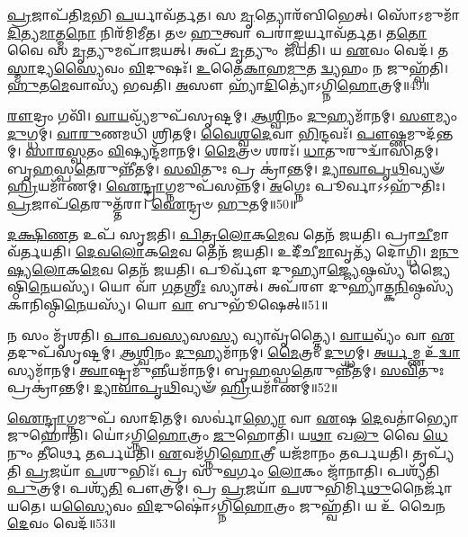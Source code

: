 \-\ul{𑌪𑍍𑌰}\-𑌜𑌾𑌪᳴𑌤𑌿\-\ul{𑌮}\-𑌭𑌿 \ul{𑌪}\-𑌰𑍍𑌯𑌾𑌵᳴𑌰𑍍𑌤𑌤।
𑌸 \ul{𑌮𑍃}\-𑌤𑍍𑌯𑍋𑌰᳴𑌬𑌿𑌭𑍇𑌤𑍍।
𑌸𑍋᳴𑌽𑌮𑍁𑌮𑌾᳴\-\ul{𑌦𑌿}\-𑌤𑍍𑌯\-\-\ul{𑌮𑌾}\-𑌤𑍍𑌮\-\ul{𑌨𑍋} 𑌨𑌿𑌰᳴𑌮𑌿𑌮𑍀𑌤।
𑌤𑍞 \ul{𑌹𑍁}\-𑌤𑍍𑌵𑌾 𑌪𑌰𑌾॑\-\ul{𑌙𑍍𑌪}\-𑌰𑍍𑌯𑌾𑌵᳴𑌰𑍍𑌤𑌤।
𑌤\-\ul{𑌤𑍋} 𑌵𑍈 𑌸 \ul{𑌮𑍃}\-𑌤𑍍𑌯𑍁𑌮𑌪𑌾᳴𑌜𑌯𑌤𑍍।
𑌅𑌪᳴ \ul{𑌮𑍃}\-𑌤𑍍𑌯𑍁𑌂 𑌜᳴𑌯𑌤𑌿।
𑌯 \ul{𑌏}\-𑌵𑌂 𑌵𑍇𑌦᳴।
𑌤\-\ul{𑌸𑍍𑌮𑌾}\-𑌦𑍍𑌯\-\ul{𑌸𑍍𑌯𑍈}\-𑌵𑌂 \ul{𑌵𑌿}\-𑌦𑍁𑌷𑌃᳴।
\-\ul{𑌉}\-𑌤𑍈\-\ul{𑌕𑌾}\-𑌹\-\ul{𑌮𑍁}\-𑌤 \ul{𑌦𑍍𑌵𑍍𑌯}\-𑌹𑌂 𑌨 𑌜𑍁𑌹𑍍𑌵᳴𑌤𑌿।
\-\ul{𑌹𑍁}\-𑌤\-\ul{𑌮𑍇}\-𑌵𑌾𑌸𑍍𑌯᳴ 𑌭𑌵𑌤𑌿।
\-\ul{𑌅}\-𑌸𑍗 𑌹𑍍𑌯𑌾᳴\-\ul{𑌦𑌿}\-𑌤𑍍𑌯𑍋॑\-𑌽𑌗𑍍𑌨𑌿\-\ul{𑌹𑍋}\-𑌤𑍍𑌰𑌮𑍍॥49॥\anuvakamend[\-\ul{𑌤}\-𑌨𑍁𑌵𑍈᳴ \ul{𑌵𑌾}\-𑌯𑍁\-\ul{𑌰}\-𑌗𑍍𑌨𑌿𑌰𑍍𑌭᳴\-\ul{𑌵}\-𑌤𑍍𑌯𑌵𑌿᳴𑌤𑍍𑌵𑌾 𑌭\-\ul{𑌵}\-𑌤𑍍𑌯𑍇𑌕𑌂᳴ 𑌚]

\-\ul{𑌰𑍗}\-𑌦𑍍𑌰𑌂 𑌗𑌵𑌿᳴।
\-\ul{𑌵𑌾}\-\-\ul{𑌯}\-𑌵𑍍𑌯᳴𑌮𑍁𑌪᳴𑌸𑍃𑌷𑍍𑌟𑌮𑍍।
\-\ul{𑌆}\-\-\ul{𑌶𑍍𑌵𑌿}\-𑌨𑌂 \ul{𑌦𑍁}\-𑌹𑍍𑌯𑌮𑌾᳴𑌨𑌮𑍍।
\-\ul{𑌸𑍗}\-𑌮𑍍𑌯𑌂 \ul{𑌦𑍁}\-𑌗𑍍𑌧𑌮𑍍।
\-\ul{𑌵𑌾}\-\-\ul{𑌰𑍁}\-𑌣𑌮𑌧𑌿᳴ 𑌶𑍍𑌰𑌿𑌤𑌮𑍍।
\-\ul{𑌵𑍈}\-\-\ul{𑌶𑍍𑌵}\-\-\ul{𑌦𑍇}\-𑌵𑌾 \ul{𑌭𑌿}\-𑌨𑍍𑌦𑌵𑌃᳴।
\-\ul{𑌪𑍗}\-𑌷𑍍𑌣𑌮𑍁𑌦᳴𑌨𑍍𑌤𑌮𑍍।
\-\ul{𑌸𑌾}\-\-\ul{𑌰}\-\-\ul{𑌸𑍍𑌵}\-𑌤𑌂 \ul{𑌵𑌿}\-𑌷𑍍𑌯𑌨𑍍𑌦᳴𑌮𑌾𑌨𑌮𑍍।
\-\ul{𑌮𑍈}\-𑌤𑍍𑌰𑍞 𑌶𑌰𑌃᳴।
\-\ul{𑌧𑌾}\-𑌤𑍁𑌰𑍁𑌦𑍍𑌵𑌾᳴𑌸𑌿𑌤𑌮𑍍।
𑌬𑍃\-\ul{𑌹}\-𑌸𑍍𑌪\-\ul{𑌤𑍇}\-𑌰𑍁𑌨𑍍𑌨𑍀᳴𑌤𑌮𑍍।
\-\ul{𑌸}\-\-\ul{𑌵𑌿}\-𑌤𑍁𑌃 𑌪𑍍𑌰 𑌕𑍍𑌰𑌾॑𑌨𑍍𑌤𑌮𑍍।
\-\ul{𑌦𑍍𑌯𑌾}\-\-\ul{𑌵𑌾}\-\-\ul{𑌪𑍃}\-\-\ul{𑌥𑌿}\-𑌵𑍍𑌯𑍟᳴ \ul{𑌹𑍍𑌰𑌿}\-𑌯𑌮𑌾᳴𑌣𑌮𑍍।
\-\ul{𑌐}\-\-\ul{𑌨𑍍𑌦𑍍𑌰𑌾}\-𑌗𑍍𑌨𑌮𑍁𑌪᳴𑌸𑌨𑍍𑌨𑌮𑍍।
\-\ul{𑌅}\-𑌗𑍍𑌨𑍇𑌃 𑌪𑍂𑌰𑍍𑌵𑌾\-𑌽𑌽𑌹𑍁᳴𑌤𑌿𑌃।
\-\ul{𑌪𑍍𑌰}\-𑌜𑌾𑌪᳴\-\ul{𑌤𑍇}\-𑌰𑍁𑌤𑍍𑌤᳴𑌰𑌾।
\-\ul{𑌐}\-𑌨𑍍𑌦𑍍𑌰𑍞 \ul{𑌹𑍁}\-𑌤𑌮𑍍॥50॥\anuvakamend[𑌉𑌦𑍍𑌵𑌾᳴𑌸𑌿𑌤𑍞 \ul{𑌸}\-𑌪𑍍𑌤 𑌚᳴]

\-\ul{𑌦}\-\-\ul{𑌕𑍍𑌷𑌿}\-\-\ul{𑌣}\-𑌤 𑌉𑌪᳴ 𑌸𑍃𑌜𑌤𑌿।
\-\ul{𑌪𑌿}\-\-\ul{𑌤𑍃}\-\-\ul{𑌲𑍋}\-𑌕\-\ul{𑌮𑍇}\-𑌵 𑌤𑍇𑌨᳴ 𑌜𑌯𑌤𑌿।
𑌪𑍍𑌰𑌾\-\ul{𑌚𑍀}\-𑌮𑌾 𑌵᳴𑌰𑍍𑌤𑌯𑌤𑌿।
\-\ul{𑌦𑍇}\-\-\ul{𑌵}\-\-\ul{𑌲𑍋}\-𑌕\-\ul{𑌮𑍇}\-𑌵 𑌤𑍇𑌨᳴ 𑌜𑌯𑌤𑌿।
𑌉𑌦𑍀᳴𑌚𑍀\-\ul{𑌮𑌾}\-𑌵𑍃𑌤𑍍𑌯᳴ 𑌦𑍋𑌗𑍍𑌧𑌿।
\-\ul{𑌮}\-\-\ul{𑌨𑍁}\-\-\ul{𑌷𑍍𑌯}\-\-\ul{𑌲𑍋}\-𑌕\-\ul{𑌮𑍇}\-𑌵 𑌤𑍇𑌨᳴ 𑌜𑌯𑌤𑌿।
𑌪𑍂𑌰𑍍𑌵𑍗᳴ 𑌦𑍁𑌹𑍍𑌯𑌾\-\ul{𑌜𑍍𑌜𑍍𑌯𑍇}\-𑌷𑍍𑌠𑌸𑍍𑌯᳴ 𑌜𑍍𑌯𑍈𑌷𑍍𑌠𑌿\-\ul{𑌨𑍇}\-𑌯𑌸𑍍𑌯᳴।
𑌯𑍋 𑌵𑌾᳴ \ul{𑌗}\-𑌤\-\ul{𑌶𑍍𑌰𑍀𑌃} 𑌸𑍍𑌯𑌾𑌤𑍍।
𑌅𑌪᳴𑌰𑍗 𑌦𑍁𑌹𑍍𑌯𑌾𑌤𑍍𑌕\-\ul{𑌨𑌿}\-𑌷𑍍𑌠𑌸𑍍𑌯᳴ 𑌕𑌾𑌨𑌿𑌷𑍍𑌠𑌿\-\ul{𑌨𑍇}\-𑌯𑌸𑍍𑌯᳴।
𑌯𑍋 \ul{𑌵𑌾} 𑌬𑍁𑌭𑍂᳴𑌷𑍇𑌤𑍍॥51॥

𑌨 𑌸𑌂 𑌮𑍃᳴𑌶𑌤𑌿।
\-\ul{𑌪𑌾}\-\-\ul{𑌪}\-\-\ul{𑌵}\-\-\ul{𑌸𑍍𑌯}\-𑌸\-\ul{𑌸𑍍𑌯} 𑌵𑍍𑌯𑌾𑌵𑍃᳴𑌤𑍍𑌤𑍍𑌯𑍈।
\-\ul{𑌵𑌾}\-\-\ul{𑌯}\-𑌵𑍍𑌯𑌂᳴ 𑌵𑌾 \ul{𑌏}\-𑌤𑌦𑍁𑌪᳴𑌸𑍃𑌷𑍍𑌟𑌮𑍍।
\-\ul{𑌆}\-\-\ul{𑌶𑍍𑌵𑌿}\-𑌨𑌂 \ul{𑌦𑍁}\-𑌹𑍍𑌯𑌮𑌾᳴𑌨𑌮𑍍।
\-\ul{𑌮𑍈}\-𑌤𑍍𑌰𑌂 \ul{𑌦𑍁}\-𑌗𑍍𑌧𑌮𑍍।
\-\ul{𑌅}\-\-\ul{𑌰𑍍𑌯}\-𑌮𑍍𑌣 𑌉᳴\-\ul{𑌦𑍍𑌵𑌾}\-𑌸𑍍𑌯𑌮𑌾᳴𑌨𑌮𑍍।
\-\ul{𑌤𑍍𑌵𑌾}\-𑌷𑍍𑌟𑍍𑌰𑌮𑍁᳴\-\ul{𑌨𑍍𑌨𑍀}\-𑌯𑌮𑌾᳴𑌨𑌮𑍍।
𑌬𑍃\-\ul{𑌹}\-𑌸𑍍𑌪\-\ul{𑌤𑍇}\-𑌰𑍁𑌨𑍍𑌨𑍀᳴𑌤𑌮𑍍।
\-\ul{𑌸}\-\-\ul{𑌵𑌿}\-𑌤𑍁𑌃 𑌪𑍍𑌰𑌕𑍍𑌰𑌾॑𑌨𑍍𑌤𑌮𑍍।
\-\ul{𑌦𑍍𑌯𑌾}\-\-\ul{𑌵𑌾}\-\-\ul{𑌪𑍃}\-\-\ul{𑌥𑌿}\-𑌵𑍍𑌯𑍟᳴ \ul{𑌹𑍍𑌰𑌿}\-𑌯𑌮𑌾᳴𑌣𑌮𑍍॥52॥

\-\ul{𑌐}\-\-\ul{𑌨𑍍𑌦𑍍𑌰𑌾}\-𑌗𑍍𑌨𑌮𑍁𑌪᳴ 𑌸𑌾𑌦𑌿𑌤𑌮𑍍।
𑌸𑌰𑍍𑌵𑌾॑\-\ul{𑌭𑍍𑌯𑍋} 𑌵𑌾 \ul{𑌏}\-𑌷 \ul{𑌦𑍇}\-𑌵𑌤𑌾॑𑌭𑍍𑌯𑍋 𑌜𑍁𑌹𑍋𑌤𑌿।
𑌯𑍋॑𑌽𑌗𑍍𑌨𑌿\-\ul{𑌹𑍋}\-𑌤𑍍𑌰𑌂 \ul{𑌜𑍁}\-𑌹𑍋𑌤𑌿᳴।
𑌯\-\ul{𑌥𑌾} 𑌖\-\ul{𑌲𑍁} 𑌵𑍈 \ul{𑌧𑍇}\-𑌨𑍁𑌂 \ul{𑌤𑍀}\-𑌰𑍍𑌥𑍇 \ul{𑌤}\-𑌰𑍍𑌪𑌯᳴𑌤𑌿।
\-\ul{𑌏}\-𑌵𑌮᳴𑌗𑍍𑌨𑌿\-\ul{𑌹𑍋}\-𑌤𑍍𑌰𑍀 𑌯𑌜᳴𑌮𑌾𑌨𑌂 𑌤𑌰𑍍𑌪𑌯𑌤𑌿।
𑌤𑍃𑌪𑍍𑌯᳴𑌤𑌿 \ul{𑌪𑍍𑌰}\-𑌜𑌯𑌾᳴ \ul{𑌪}\-𑌶𑍁𑌭𑌿𑌃᳴।
𑌪𑍍𑌰 𑌸𑍁᳴\-\ul{𑌵}\-𑌰𑍍𑌗𑌂 \ul{𑌲𑍋}\-𑌕𑌂 𑌜𑌾᳴𑌨𑌾𑌤𑌿।
𑌪𑌶𑍍𑌯᳴𑌤𑌿 \ul{𑌪𑍁}\-𑌤𑍍𑌰𑌮𑍍।
𑌪𑌶𑍍𑌯᳴\-\ul{𑌤𑌿} 𑌪𑍗𑌤𑍍𑌰𑌮𑍍॑।
𑌪𑍍𑌰 \ul{𑌪𑍍𑌰}\-𑌜𑌯𑌾᳴ \ul{𑌪}\-𑌶𑍁𑌭𑌿᳴𑌰𑍍𑌮𑌿\-\ul{𑌥𑍁}\-𑌨𑍈𑌰𑍍𑌜𑌾᳴𑌯𑌤𑍇।
𑌯\-\ul{𑌸𑍍𑌯𑍈}\-𑌵𑌂 \ul{𑌵𑌿}\-𑌦𑍁𑌷𑍋॑\-𑌽𑌗𑍍𑌨𑌿\-\ul{𑌹𑍋}\-𑌤𑍍𑌰𑌂 𑌜𑍁𑌹𑍍𑌵᳴𑌤𑌿।
𑌯 𑌉᳴ 𑌚𑍈𑌨\-\ul{𑌦𑍇}\-𑌵𑌂 𑌵𑍇𑌦᳴॥53॥\anuvakamend[𑌬𑍁𑌭𑍂᳴𑌷𑍇\-\ul{𑌦𑍍𑌧𑍍𑌰𑌿}\-𑌯𑌮𑌾᳴𑌣𑌞𑍍𑌜𑌾𑌯\-\ul{𑌤𑍇} 𑌦𑍍𑌵𑍇 𑌚᳴]

